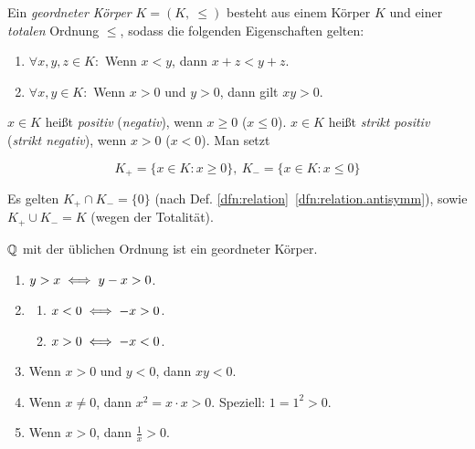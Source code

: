 \documentclass[12pt]{scrreprt}
\begin{document}
\begin{dfn}\label{dfn:geordn.koerper}
Ein \emph{geordneter Körper} $K = (K,\ \leq)$ besteht aus einem Körper $K$ und einer \emph{totalen} Ordnung $\leq$, sodass die folgenden Eigenschaften gelten:
\begin{enumerate} %
\item\label{dfn:geordn.koerper.01} $\forall x, y, z \in K:$ Wenn $x < y$, dann $x + z < y + z$.
\item\label{dfn:geordn.koerper.02} $\forall x, y \in K:$ Wenn $x > 0$ und $y > 0$, dann gilt $xy > 0$.
\end{enumerate}

$x \in K$ heißt \emph{positiv} (\emph{negativ}), wenn $x \geq 0$ ($x \leq 0$). $x \in K$ heißt \emph{strikt positiv} (\emph{strikt negativ}), wenn $x > 0$ ($x < 0$). Man setzt

\[K_+ = \{x \in K: x \geq 0\},\ K_- = \{x \in K: x \leq 0\}\]
\end{dfn}

\medskip\noindent\makebox[.25\textwidth]{\hrulefill}\medskip %

Es gelten $K_+ \cap K_- = \{0\}$ (nach Def. \ref{dfn:relation}~{\ref{dfn:relation.antisymm}}), sowie $K_+ \cup K_- = K$ (wegen der Totalität).

\begin{bsp*}
$\mathbb{Q}$ mit der üblichen Ordnung ist ein geordneter Körper.
\end{bsp*}

\begin{satz}\label{satz:geordn.koerper}
\begin{enumerate} %
\item $y > x \iff y - x > 0$.
\item\label{satz:geordn.koerp.b} \begin{enumerate}%
	\item $x < 0 \iff -x > 0$.
	\item $x > 0 \iff -x < 0$.
\end{enumerate}
\item Wenn $x > 0$ und  $y < 0$, dann $xy < 0$.
\item Wenn $x \neq 0$, dann $x^2 = x \cdot x > 0$. Speziell: $1 = 1^2 > 0$.
\item Wenn $x > 0$, dann $\displaystyle\frac{1}{x} > 0$.
\end{enumerate}
\end{satz}
\end{document}

